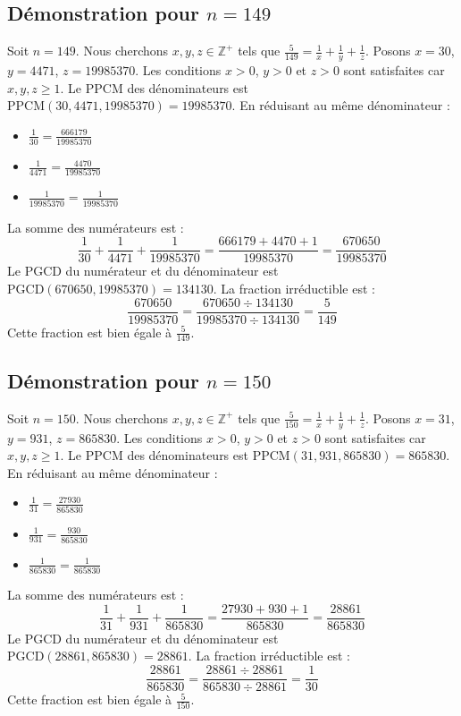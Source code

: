 \documentclass[11pt,a4paper]{article}
\begin{document}
\subsection{Démonstration pour $n = 149$}
Soit $n = 149$. Nous cherchons $x, y, z \in \mathbb{Z}^{+}$ tels que $\frac{5}{149} = \frac{1}{x} + \frac{1}{y} + \frac{1}{z}$.
Posons $x = 30$, $y = 4471$, $z = 19985370$.
Les conditions $x > 0$, $y > 0$ et $z > 0$ sont satisfaites car $x, y, z \geq 1$.
Le PPCM des dénominateurs est $\text{PPCM}(30, 4471, 19985370) = 19985370$.
En réduisant au même dénominateur :
\begin{itemize}
    \item $\frac{1}{30} = \frac{666179}{19985370}$
    \item $\frac{1}{4471} = \frac{4470}{19985370}$
    \item $\frac{1}{19985370} = \frac{1}{19985370}$
\end{itemize}
La somme des numérateurs est :
$$ \frac{1}{30} + \frac{1}{4471} + \frac{1}{19985370} = \frac{666179 + 4470 + 1}{19985370} = \frac{670650}{19985370} $$
Le PGCD du numérateur et du dénominateur est $\text{PGCD}(670650, 19985370) = 134130$.
La fraction irréductible est :
$$ \frac{670650}{19985370} = \frac{670650 \div 134130}{19985370 \div 134130} = \frac{5}{149} $$
Cette fraction est bien égale à $\frac{5}{149}$.

\subsection{Démonstration pour $n = 150$}
Soit $n = 150$. Nous cherchons $x, y, z \in \mathbb{Z}^{+}$ tels que $\frac{5}{150} = \frac{1}{x} + \frac{1}{y} + \frac{1}{z}$.
Posons $x = 31$, $y = 931$, $z = 865830$.
Les conditions $x > 0$, $y > 0$ et $z > 0$ sont satisfaites car $x, y, z \geq 1$.
Le PPCM des dénominateurs est $\text{PPCM}(31, 931, 865830) = 865830$.
En réduisant au même dénominateur :
\begin{itemize}
    \item $\frac{1}{31} = \frac{27930}{865830}$
    \item $\frac{1}{931} = \frac{930}{865830}$
    \item $\frac{1}{865830} = \frac{1}{865830}$
\end{itemize}
La somme des numérateurs est :
$$ \frac{1}{31} + \frac{1}{931} + \frac{1}{865830} = \frac{27930 + 930 + 1}{865830} = \frac{28861}{865830} $$
Le PGCD du numérateur et du dénominateur est $\text{PGCD}(28861, 865830) = 28861$.
La fraction irréductible est :
$$ \frac{28861}{865830} = \frac{28861 \div 28861}{865830 \div 28861} = \frac{1}{30} $$
Cette fraction est bien égale à $\frac{5}{150}$.
\end{document}
